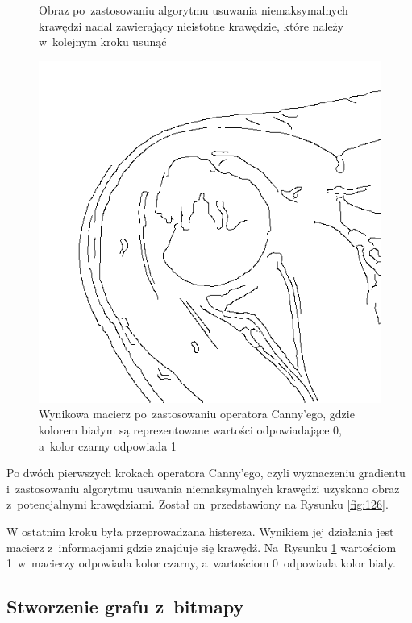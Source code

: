 \documentclass[a4paper,11pt,twoside,openright]{report}
\theoremstyle{definition}
\begin{document}
\begin{figure}[p!]
		\caption{Obraz po~zastosowaniu algorytmu usuwania
	niemaksymalnych krawędzi nadal zawierający nieistotne krawędzie, które należy
	w~kolejnym kroku usunąć}
		\label{fig:126}
	\endminipage\hfill
		\includegraphics[width=\linewidth]{127}
		\caption{Wynikowa macierz po~zastosowaniu
	operatora Canny'ego, gdzie kolorem białym są
	reprezentowane wartości odpowiadające 0, a~kolor czarny odpowiada 1}
		\label{fig:127}
	\endminipage\hfill
\end{figure}

Po dwóch pierwszych krokach operatora Canny'ego, czyli wyznaczeniu gradientu i~zastosowaniu algorytmu
usuwania niemaksymalnych krawędzi uzyskano obraz z~potencjalnymi krawędziami. Został on~przedstawiony
na Rysunku \ref{fig:126}.

W ostatnim kroku była przeprowadzana histereza. Wynikiem jej działania jest macierz z~informacjami
gdzie znajduje się krawędź. Na~Rysunku \ref{fig:127} wartościom 1~w~macierzy odpowiada kolor czarny,
a~wartościom 0~odpowiada kolor biały.

\pagebreak

\subsection {Stworzenie grafu z~bitmapy}
\end{document}
